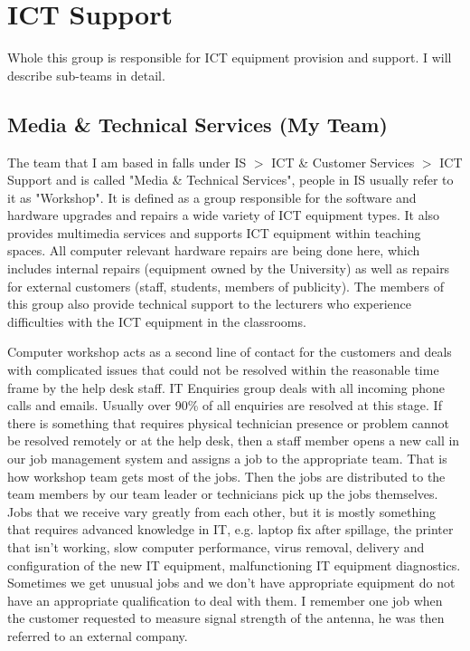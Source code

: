 \documentclass[10pt,a4paper,headinclude=true]{report}
\begin{document}
\section{ICT Support}
Whole this group is responsible for ICT equipment provision and support. I will describe sub-teams in detail.
\subsection{Media \& Technical Services (My Team)}
The team that I am based in falls under IS $>$ ICT \& Customer Services $>$ ICT Support and is called "Media \& Technical Services", people in IS usually refer to it as "Workshop". It is defined as a group responsible for the software and hardware upgrades and repairs a wide variety of ICT equipment types. It also provides multimedia services and supports ICT equipment within teaching spaces. All computer relevant hardware repairs are being done here, which includes internal repairs (equipment owned by the University) as well as repairs for external customers (staff, students, members of publicity). The members of this group also provide technical support to the lecturers who experience difficulties with the ICT equipment in the classrooms. 

Computer workshop acts as a second line of contact for the customers and deals with complicated issues that could not be resolved within the reasonable time frame by the help desk staff. IT Enquiries group deals with all incoming phone calls and emails. Usually over 90\% of all enquiries are resolved at this stage. If there is something that requires physical technician presence or problem cannot be resolved remotely or at the help desk, then a staff member opens a new call in our job management system and assigns a job to the appropriate team. That is how workshop team gets most of the jobs. Then the jobs are distributed to the team members by our team leader or technicians pick up the jobs themselves. Jobs that we receive vary greatly from each other, but it is mostly something that requires advanced knowledge in IT, e.g. laptop fix after spillage, the printer that isn't working, slow computer performance, virus removal, delivery and configuration of the new IT equipment, malfunctioning IT equipment diagnostics. Sometimes we get unusual jobs and we don't have appropriate equipment do not have an appropriate qualification to deal with them. I remember one job when the customer requested to measure signal strength of the antenna, he was then referred to an external company.
\end{document}
